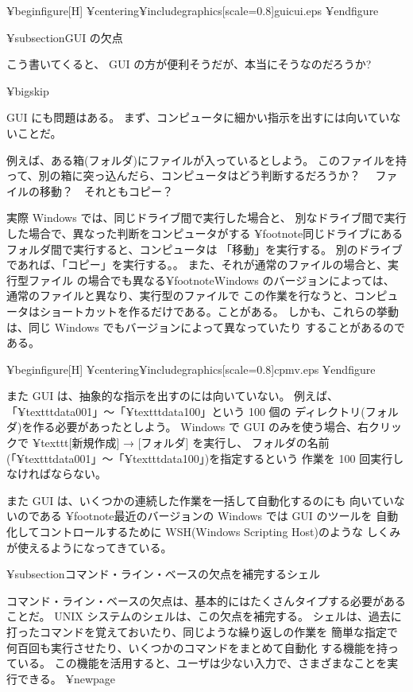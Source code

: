 ¥begin{figure}[H]
¥centering{¥includegraphics[scale=0.8]{guicui.eps}}
¥end{figure}

¥subsection{GUI の欠点}

こう書いてくると、 GUI の方が便利そうだが、本当にそうなのだろうか?

¥bigskip

 GUI にも問題はある。
まず、コンピュータに細かい指示を出すには向いていないことだ。

例えば、ある箱(フォルダ)にファイルが入っているとしよう。
このファイルを持って、別の箱に突っ込んだら、コンピュータはどう判断するだろうか？~~
ファイルの移動？~~それともコピー？~~

実際 Windows では、同じドライブ間で実行した場合と、
別なドライブ間で実行した場合で、異なった判断をコンピュータがする
¥footnote{同じドライブにあるフォルダ間で実行すると、コンピュータは
「移動」を実行する。
別のドライブであれば、「コピー」を実行する。}。
また、それが通常のファイルの場合と、実行型ファイル
の場合でも異なる¥footnote{Windows のバージョンによっては、
通常のファイルと異なり、実行型のファイルで
この作業を行なうと、コンピュータはショートカットを作るだけである。}ことがある。
しかも、これらの挙動は、同じ Windows でもバージョンによって異なっていたり
することがあるのである。

¥begin{figure}[H]
¥centering{¥includegraphics[scale=0.8]{cpmv.eps}}
¥end{figure}

また GUI は、抽象的な指示を出すのには向いていない。
例えば、「¥texttt{data001}」〜「¥texttt{data100}」という 100 個の
ディレクトリ(フォルダ)を作る必要があったとしよう。
 Windows で GUI のみを使う場合、右クリックで ¥texttt{[新規作成] → [フォルダ]} を実行し、
フォルダの名前(「¥texttt{data001}」〜「¥texttt{data100}」)を指定するという
作業を 100 回実行しなければならない。

また GUI は、いくつかの連続した作業を一括して自動化するのにも
向いていないのである
¥footnote{最近のバージョンの Windows では GUI のツールを
自動化してコントロールするために WSH(Windows Scripting Host)のような
しくみが使えるようになってきている}。

¥subsection{コマンド・ライン・ベースの欠点を補完するシェル}

コマンド・ライン・ベースの欠点は、基本的にはたくさんタイプする必要があることだ。
 UNIX システムのシェルは、この欠点を補完する。
シェルは、過去に打ったコマンドを覚えておいたり、同じような繰り返しの作業を
簡単な指定で何百回も実行させたり、いくつかのコマンドをまとめて自動化
する機能を持っている。
この機能を活用すると、ユーザは少ない入力で、さまざまなことを実行できる。
¥newpage

